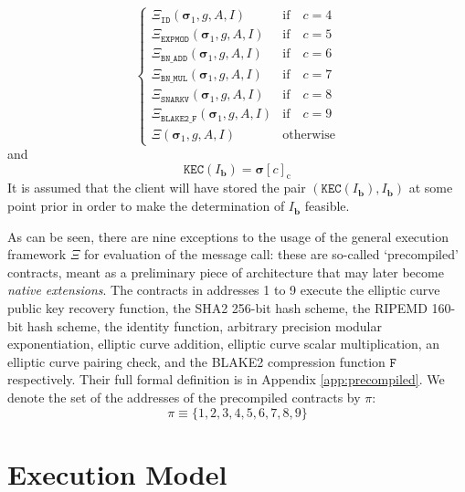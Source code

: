 \documentclass[9pt,oneside]{amsart}
\begin{document}
\begin{multicols}{2}
\begin{equation}
\begin{cases}
\Xi_{\mathtt{ID}}       (\boldsymbol{\sigma}_1, g, A, I) & \text{if} \quad c = 4 \\
\Xi_{\mathtt{EXPMOD}}   (\boldsymbol{\sigma}_1, g, A, I) & \text{if} \quad c = 5 \\
\Xi_{\mathtt{BN\_ADD}}  (\boldsymbol{\sigma}_1, g, A, I) & \text{if} \quad c = 6 \\
\Xi_{\mathtt{BN\_MUL}}  (\boldsymbol{\sigma}_1, g, A, I) & \text{if} \quad c = 7 \\
\Xi_{\mathtt{SNARKV}}   (\boldsymbol{\sigma}_1, g, A, I) & \text{if} \quad c = 8 \\
\Xi_{\mathtt{BLAKE2\_F}}(\boldsymbol{\sigma}_1, g, A, I) & \text{if} \quad c = 9 \\
\Xi                     (\boldsymbol{\sigma}_1, g, A, I) & \text{otherwise} \end{cases}
\end{equation}
and
\begin{equation}
\mathtt{KEC}(I_{\mathbf{b}}) = \boldsymbol{\sigma}[c]_{\mathrm{c}}
\end{equation}
It is assumed that the client will have stored the pair $(\mathtt{KEC}(I_{\mathbf{b}}), I_{\mathbf{b}})$ at some point prior in order to make the determination of $I_{\mathbf{b}}$ feasible.

As can be seen, there are nine exceptions to the usage of the general execution framework $\Xi$ for evaluation of the message call: these are so-called `precompiled' contracts, meant as a preliminary piece of architecture that may later become \textit{native extensions}.
The contracts in addresses 1 to 9 execute the elliptic curve public key recovery function, the SHA2 256-bit hash scheme, the RIPEMD 160-bit hash scheme, the identity function, arbitrary precision modular exponentiation, elliptic curve addition, elliptic curve scalar multiplication, an elliptic curve pairing check, and the BLAKE2 compression function $\mathtt{F}$ respectively.
Their full formal definition is in Appendix \ref{app:precompiled}.
\hypertarget{precompiled_set}{}We denote the set of the addresses of the precompiled contracts by $\pi$:
\begin{equation}
\pi \equiv \{1, 2, 3, 4, 5, 6, 7, 8, 9 \}
\end{equation}

\section{Execution Model} \label{ch:model}


\end{multicols}
\end{document}
